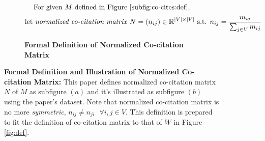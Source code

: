\begin{figure}[ht]
    \begin{subfigure}[b]{1\textwidth}
        \[\text{For given $M$ defined in Figure \ref{subfig:co-cites:def},} \]
        \[\text{let \textit{normalized co-citation matrix} } N = (n_{ij}) \in \Bbb{R}^{|V| \times |V|} \text{ s.t. } n_{ij} = \frac{m_{ij}}{\sum_{j \in V}m_{ij}} \]
        \caption{\textbf{Formal Definition of Normalized Co-citation Matrix}}
        \label{subfig:co-cites:def:normal}
    \end{subfigure}
    \vfill
    \begin{subfigure}[b]{1\textwidth}
    \end{subfigure}
    \caption{\textbf{Formal Definition and Illustration of Normalized Co-citation Matrix:} This paper defines normalized co-citation matrix $N$ of $M$ as subfigure $(a)$ and it's illustrated as subfigure $(b)$ using the paper's dataset. Note that normalized co-citation matrix is no more \textit{symmetric}, $n_{ij} \neq n_{ji} \text{ } \forall i,j \in V$. This definition is prepared to fit the definition of co-citation matrix to that of $W$ in Figure \ref{fig:def}.} 
    \label{fig:def-illus-normal-co-cites}
\end{figure}